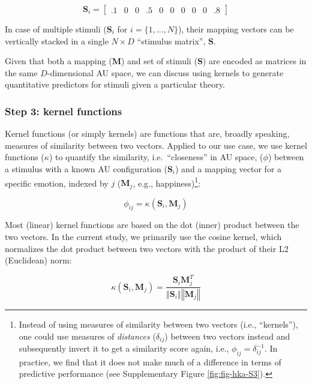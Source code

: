 \documentclass[11pt,american,a4paper,oneside,]{memoir} %
\let\rmarkdownfootnote\footnote%
\def\footnote{\protect\rmarkdownfootnote}
\begin{document}
\begin{equation}
\mathbf{S}_{i} = \begin{bmatrix} .1 & 0 & 0 & .5 & 0 & 0 & 0 & 0 & 0 & .8 \end{bmatrix}
\end{equation}

In case of multiple stimuli (\(\mathbf{S}_{i}\) for \(i = \{1, \dots, N\}\)), their mapping vectors can be vertically stacked in a single \(N \times D\) ``stimulus matrix'', \(\mathbf{S}\).

Given that both a mapping (\(\mathbf{M}\)) and set of stimuli (\(\mathbf{S}\)) are encoded as matrices in the same \(D\)-dimensional AU space, we can discuss using kernels to generate quantitative predictors for stimuli given a particular theory.

\hypertarget{step-3-kernel-functions}{%
\subsubsection{Step 3: kernel functions}\label{step-3-kernel-functions}}

Kernel functions (or simply kernels) are functions that are, broadly speaking, measures of similarity between two vectors. Applied to our use case, we use kernel functions (\(\kappa\)) to quantify the similarity, i.e.~``closeness'' in AU space, (\(\phi\)) between a stimulus with a known AU configuration (\(\mathbf{S}_{i}\)) and a mapping vector for a specific emotion, indexed by \(j\) (\(\mathbf{M}_{j}\), e.g., happiness)\footnote{Instead of using measures of similarity between two vectors (i.e., ``kernels''), one could use measures of \emph{distances} (\(\delta_{ij}\)) between two vectors instead and subsequently invert it to get a similarity score again, i.e., \(\phi_{ij} = \delta_{ij}^{-1}\). In practice, we find that it does not make much of a difference in terms of predictive performance (see Supplementary Figure \ref{fig:fig-hka-S3}).}:

\begin{equation}
\phi_{ij} = \kappa(\mathbf{S}_{i}, \mathbf{M}_{j})
\end{equation}

Most (linear) kernel functions are based on the dot (inner) product between the two vectors. In the current study, we primarily use the cosine kernel, which normalizes the dot product between two vectors with the product of their L2 (Euclidean) norm:

\begin{equation}
\kappa(\mathbf{S}_{i}, \mathbf{M}_{j}) = \frac{\mathbf{S}_{i}\mathbf{M}_{j}^{T}}{\left\Vert \mathbf{S}_{i} \right\Vert \left\Vert \mathbf{M}_{j} \right\Vert}
\end{equation}
\end{document}
